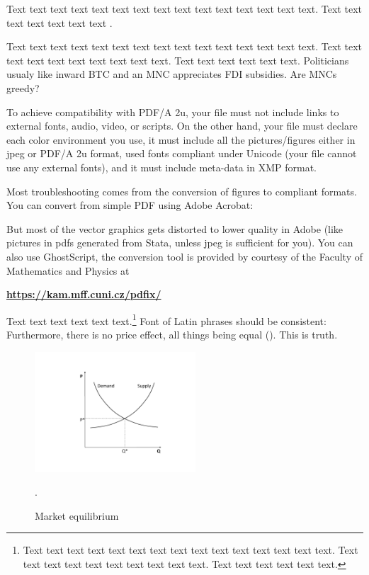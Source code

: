 Text text text text text text text text text text text text text text text. Text text text text text text text \cite[see, ,][pg.~10]{Haaparanta1996}. 



Text text text text text text text text text text text text text text text. Text text text text text text text text text text. Text text text text text text. Politicians usualy like inward \ac{BTC} and an \ac{MNC} appreciates \ac{FDI} subsidies. Are \acp{MNC} greedy?



To achieve compatibility with PDF/A 2u, your file must not include links to external fonts, audio, video, or scripts. On the other hand, your file must declare each color environment you use, it must include all the pictures/figures either in jpeg or PDF/A 2u format, used fonts compliant under Unicode (your file cannot use any external fonts), and it must include meta-data in XMP format.


Most troubleshooting comes from the conversion of figures to compliant formats. You can convert from simple PDF using Adobe Acrobat:



But most of the vector graphics gets distorted to lower quality in Adobe (like pictures in pdfs generated from Stata, unless jpeg is sufficient for you). You can also use GhostScript, the conversion tool is provided by courtesy of the Faculty of Mathematics and Physics at

\vspace{0.5cm}
\textbf{\href{https://kam.mff.cuni.cz/pdfix/}{https://kam.mff.cuni.cz/pdfix/}}
\vspace{0.5cm}

Text text text text text text.\footnote{Text text text text text text text text text text text text text text text. Text text text text text text text text text text. Text text text text text text.} Font of Latin phrases should be consistent: Furthermore, there is no  price effect, all things being equal (). This is  truth.

\begin{figure}[!htbp]
\begin{center}
\caption{Market equilibrium}
\label{fig:supply}
\includegraphics[width=60mm]{Figures/supplydemand}
\end{center}\vspace{-0.5cm}
\begin{source}\cite{Haufler2006}.\end{source}
\end{figure}

